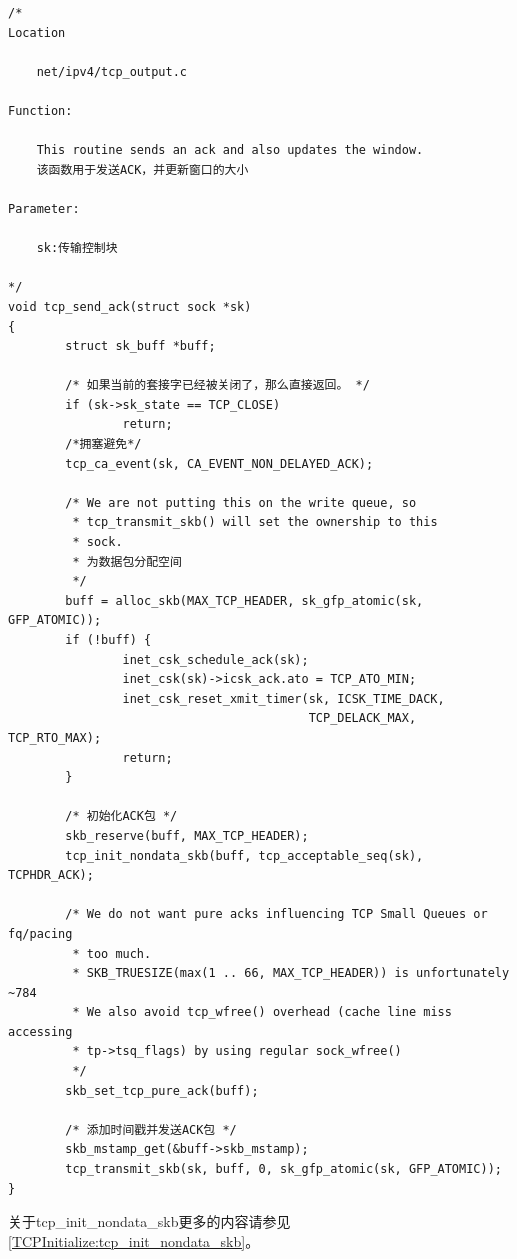 \begin{verbatim}
/* 
Location

    net/ipv4/tcp_output.c

Function:

    This routine sends an ack and also updates the window.
	该函数用于发送ACK，并更新窗口的大小 

Parameter:

    sk:传输控制块

*/
void tcp_send_ack(struct sock *sk)
{
        struct sk_buff *buff;

        /* 如果当前的套接字已经被关闭了，那么直接返回。 */
        if (sk->sk_state == TCP_CLOSE)
                return;
        /*拥塞避免*/
        tcp_ca_event(sk, CA_EVENT_NON_DELAYED_ACK);

        /* We are not putting this on the write queue, so
         * tcp_transmit_skb() will set the ownership to this
         * sock.
         * 为数据包分配空间
         */
        buff = alloc_skb(MAX_TCP_HEADER, sk_gfp_atomic(sk, GFP_ATOMIC));
        if (!buff) {
                inet_csk_schedule_ack(sk);
                inet_csk(sk)->icsk_ack.ato = TCP_ATO_MIN;
                inet_csk_reset_xmit_timer(sk, ICSK_TIME_DACK,
                                          TCP_DELACK_MAX, TCP_RTO_MAX);
                return;
        }

        /* 初始化ACK包 */
        skb_reserve(buff, MAX_TCP_HEADER);
        tcp_init_nondata_skb(buff, tcp_acceptable_seq(sk), TCPHDR_ACK);

        /* We do not want pure acks influencing TCP Small Queues or fq/pacing
         * too much.
         * SKB_TRUESIZE(max(1 .. 66, MAX_TCP_HEADER)) is unfortunately ~784
         * We also avoid tcp_wfree() overhead (cache line miss accessing
         * tp->tsq_flags) by using regular sock_wfree()
         */
        skb_set_tcp_pure_ack(buff);

        /* 添加时间戳并发送ACK包 */
        skb_mstamp_get(&buff->skb_mstamp);
        tcp_transmit_skb(sk, buff, 0, sk_gfp_atomic(sk, GFP_ATOMIC));
}
\end{verbatim}

		关于tcp\_init\_nondata\_skb更多的内容请参见\ref{TCPInitialize:tcp_init_nondata_skb}。



